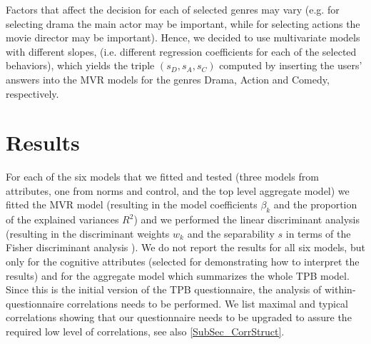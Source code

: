 \documentclass{llncs}
\begin{document}
Factors that affect the decision for each of selected genres may vary (e.g. for selecting drama the main actor may be important, while for selecting actions the movie director may be important). Hence, we decided to use multivariate models with different slopes, (i.e. different regression coefficients for each of the selected behaviors), which yields the triple $(s_D, s_A, s_C)$ computed by inserting the users' answers into the MVR models for the genres Drama, Action and Comedy, respectively.



\section{Results}\label{Sec_Results}

For each of the six models that we fitted and tested (three models from attributes, one from norms and control, and the top level aggregate model) we fitted the MVR model (resulting in the model coefficients $\beta_k$ and the proportion of the explained variances $R^2$) and we performed the linear discriminant analysis (resulting in the discriminant weights $w_k$ and the separability $s$ in terms of the Fisher discriminant analysis \cite{RencherChristensen201207}). We do not report the results for all six models, but only for the cognitive attributes (selected for demonstrating how to interpret the results) and for the aggregate model which summarizes the whole TPB model. Since this is the initial version of the TPB questionnaire, the analysis of within-questionnaire correlations needs to be performed. We list maximal and typical correlations showing that our questionnaire needs to be upgraded to assure the required low level of correlations, see also \ref{SubSec_CorrStruct}.
\end{document}
